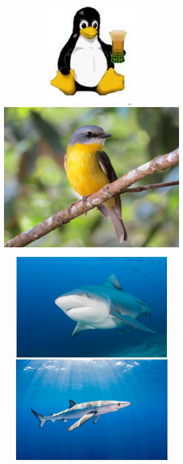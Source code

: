 \documentclass[
  letterpaper,
  DIV=11,
  numbers=noendperiod]{scrreprt}
\begin{document}
\includegraphics[width=3.64583in,height=2.08333in]{images/beer.png}
\includegraphics[width=3.63542in,height=\textheight]{images/Eastern_Yellow_Robin.jpg}

\includegraphics[width=3.64583in,height=2.08333in]{images/Bull_Shark.jpg}
\includegraphics[width=3.64583in,height=2.08333in]{images/Blue_shark.jpg}
\end{document}
